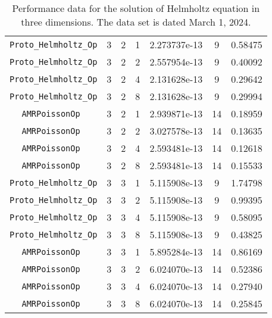 \documentclass{article}
\begin{document}
\begin{small}
\begin{table}
\begin{center}
\begin{tabular}{|c|c|c|c|c|c||c|}
\hline                                                                               
 {\tt Proto\_Helmholtz\_Op} & 3 & 2   & 1    & 2.273737e-13   &   9   &  0.58475   \\
 {\tt Proto\_Helmholtz\_Op} & 3 & 2   & 2    & 2.557954e-13   &   9   &  0.40092   \\
 {\tt Proto\_Helmholtz\_Op} & 3 & 2   & 4    & 2.131628e-13   &   9   &  0.29642   \\
 {\tt Proto\_Helmholtz\_Op} & 3 & 2   & 8    & 2.131628e-13   &   9   &  0.29994   \\
\hline                                                                               
 {\tt AMRPoissonOp        } & 3 & 2   & 1    & 2.939871e-13   &   14   &  0.18959  \\
 {\tt AMRPoissonOp        } & 3 & 2   & 2    & 3.027578e-13   &   14   &  0.13635  \\
 {\tt AMRPoissonOp        } & 3 & 2   & 4    & 2.593481e-13   &   14   &  0.12618  \\
 {\tt AMRPoissonOp        } & 3 & 2   & 8    & 2.593481e-13   &   14   &  0.15533  \\
 \hline                                                                               
 {\tt Proto\_Helmholtz\_Op} & 3 & 3   & 1    & 5.115908e-13   &   9   &   1.74798  \\
 {\tt Proto\_Helmholtz\_Op} & 3 & 3   & 2    & 5.115908e-13   &   9   &   0.99395  \\
 {\tt Proto\_Helmholtz\_Op} & 3 & 3   & 4    & 5.115908e-13   &   9   &   0.58095  \\
 {\tt Proto\_Helmholtz\_Op} & 3 & 3   & 8    & 5.115908e-13   &   9   &   0.43825  \\
\hline                                                                               
 {\tt AMRPoissonOp        } & 3 & 3   & 1    & 5.895284e-13   &  14    & 0.86169   \\
 {\tt AMRPoissonOp        } & 3 & 3   & 2    & 6.024070e-13   &  14    & 0.52386   \\
 {\tt AMRPoissonOp        } & 3 & 3   & 4    & 6.024070e-13   &  14    & 0.27940   \\
 {\tt AMRPoissonOp        } & 3 & 3   & 8    & 6.024070e-13   &  14    & 0.25845   \\
 \hline
\end{tabular}
\end{center}
\label{tab::helmholtz_3d}
\caption
    {
      Performance data for the solution of Helmholtz
      equation in three dimensions.
      The data set is dated March 1, 2024.
    }
\end{table}
\end{small}


\end{document}
